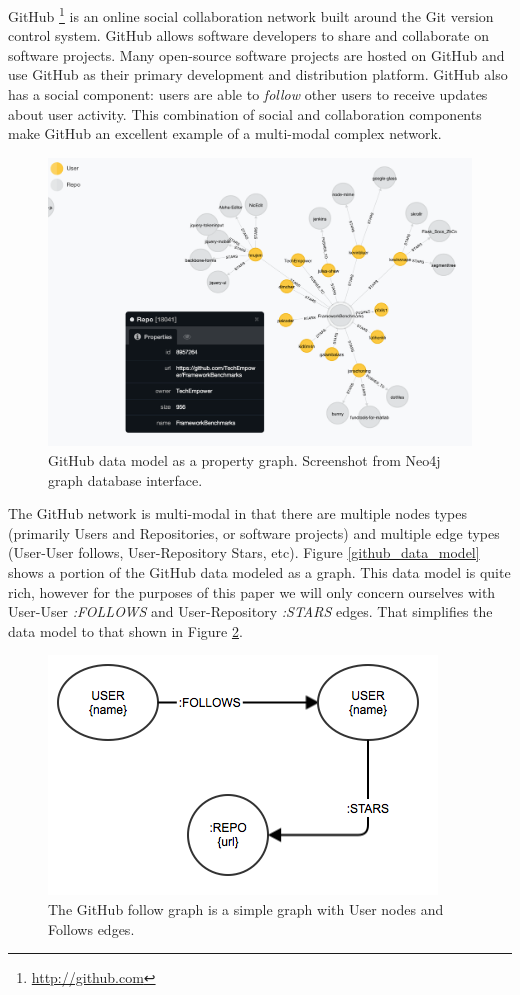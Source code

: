GitHub \footnote{\url{http://github.com}} is an online social collaboration network built around the Git version control system. GitHub allows software developers to share and collaborate on software projects. Many open-source software projects are hosted on GitHub and use GitHub as their primary development and distribution platform. GitHub also has a social component: users are able to \textit{follow} other users to receive updates about user activity. This combination of social and collaboration components make GitHub an excellent example of a multi-modal complex network. 


\begin{figure}[ht]
\vskip 0.2in
\begin{center}
\centerline{\includegraphics[width=0.75\columnwidth]{images/neo_screenshot.png}}
\caption{GitHub data model as a property graph. Screenshot from Neo4j graph database interface.}
\label{screenshot-data}
\end{center}
\vskip -0.2in
\end{figure} 


The GitHub network is multi-modal in that there are multiple nodes types (primarily Users and Repositories, or software projects) and multiple edge types (User-User follows, User-Repository Stars, etc). Figure \ref{github_data_model} shows a portion of the GitHub data modeled as a graph. This data model is quite rich, however for the purposes of this paper we will only concern ourselves with User-User \textit{:FOLLOWS} and User-Repository \textit{:STARS} edges. That simplifies the data model to that shown in Figure \ref{github_simplified_data_model}.


\begin{figure}[ht]
\vskip 0.2in
\begin{center}
\centerline{\includegraphics[width=0.3\columnwidth]{images/user_user.png}}
\caption[User-User data model]{The GitHub follow graph is a simple graph with User nodes and Follows edges.}
\label{github_simplified_data_model}
\end{center}
\vskip -0.2in
\end{figure} 

